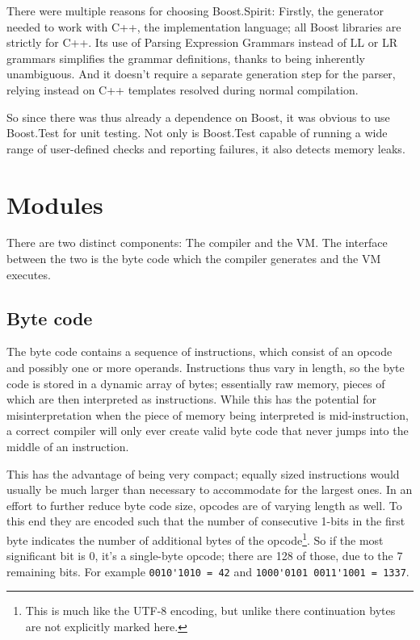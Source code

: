 		There were multiple reasons for choosing Boost.Spirit: Firstly, the generator needed to work with C++, the implementation language; all Boost libraries are strictly for C++. Its use of Parsing Expression Grammars instead of LL or LR grammars simplifies the grammar definitions, thanks to being inherently unambiguous. And it doesn't require a separate generation step for the parser, relying instead on C++ templates resolved during normal compilation.
		
		So since there was thus already a dependence on Boost, it was obvious to use Boost.Test for unit testing. Not only is Boost.Test capable of running a wide range of user-defined checks and reporting failures, it also detects memory leaks.
	
	
	\section{Modules}
	
		
		There are two distinct components: The compiler and the VM. The interface between the two is the byte code which the compiler generates and the VM executes.
		
		\subsection{Byte code}
			
			The byte code contains a sequence of instructions, which consist of an opcode and possibly one or more operands. Instructions thus vary in length, so the byte code is stored in a dynamic array of bytes; essentially raw memory, pieces of which are then interpreted as instructions. While this has the potential for misinterpretation when the piece of memory being interpreted is mid-instruction, a correct compiler will only ever create valid byte code that never jumps into the middle of an instruction.
			
			This has the advantage of being very compact; equally sized instructions would usually be much larger than necessary to accommodate for the largest ones. In an effort to further reduce byte code size, opcodes are of varying length as well. To this end they are encoded such that the number of consecutive 1-bits in the first byte indicates the number of additional bytes of the opcode\footnote{This is much like the UTF-8 encoding, but unlike there continuation bytes are not explicitly marked here.}. So if the most significant bit is 0, it's a single-byte opcode; there are 128 of those, due to the 7 remaining bits. For example \lstinline$0010'1010 = 42$ and \lstinline$1000'0101 0011'1001 = 1337$.
			
